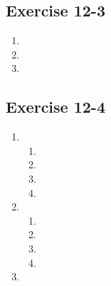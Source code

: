 \subsection{Exercise 12-3} %
\begin{enumerate}[itemsep=6pt, label=\textbf{\arabic*}. ] 
\item
\item
\item
\end{enumerate}
\subsection{Exercise 12-4} %
\begin{enumerate}[itemsep=6pt, label=\textbf{\arabic*}. ] 
\item %
\begin{enumerate}[noitemsep, label=\textbf{\alph*}. ]
 \item
\item
\item 
\item
\end{enumerate}
\item %
\begin{enumerate}[noitemsep, label=\textbf{\alph*}. ]
 \item
\item
\item 
\item
\end{enumerate}
\item %

\end{enumerate}
